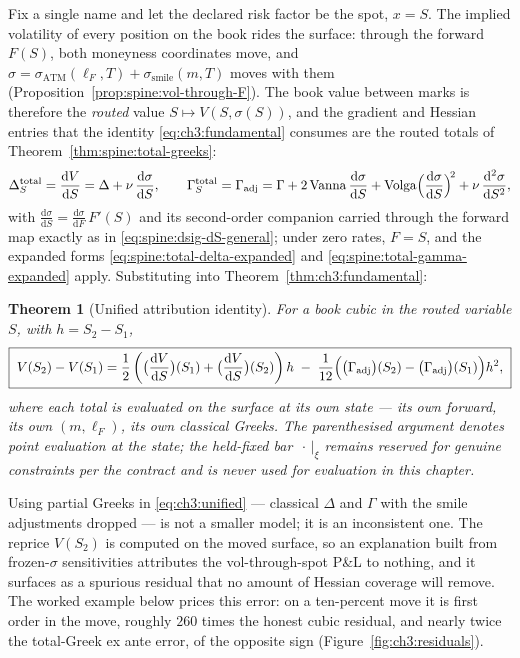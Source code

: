 \documentclass[11pt]{book}
\theoremstyle{plain}
\newtheorem{theorem}{Theorem}[chapter]
\theoremstyle{definition}
\theoremstyle{remark}
\newcommand{\mln}{m}                             %
\newcommand{\lF}{\ell_F}                         %
\newcommand{\ssm}{\sigma_{\mathrm{smile}}}       %
\newcommand{\satm}{\sigma_{\mathrm{ATM}}}        %
\newcommand{\vega}{\nu}                          %
\newcommand{\Vanna}{\mathrm{Vanna}}
\newcommand{\Volga}{\mathrm{Volga}}
\newcommand{\Gadj}{\Gamma_{\mathrm{adj}}}        %
\newcommand{\SigmaM}{\Sigma_M}                   %
\newcommand{\dd}{\mathrm{d}}                                  %
\newcommand{\pd}[2]{\frac{\partial #1}{\partial #2}}          %
\newcommand{\td}[2]{\frac{\dd #1}{\dd #2}}                    %
\newcommand{\atfixed}[2]{\left.#1\right|_{#2}}                %
\begin{document}
Fix a single name and let the declared risk factor be the spot, $x = S$. The
implied volatility of every position on the book rides the surface: through
the forward $F(S)$, both moneyness coordinates move, and
$\sigma = \satm(\lF,T) + \ssm(\mln,T)$ moves with them
(Proposition~\ref{prop:spine:vol-through-F}). The book value between marks is
therefore the \emph{routed} value $S \mapsto V(S, \sigma(S))$, and the
gradient and Hessian entries that the identity
\eqref{eq:ch3:fundamental} consumes are the routed totals of
Theorem~\ref{thm:spine:total-greeks}:
\[
  \Delta_S^{\mathrm{total}} = \td{V}{S} = \Delta + \vega\,\td{\sigma}{S},
  \qquad
  \Gamma_S^{\mathrm{total}} = \Gadj
  = \Gamma + 2\,\Vanna\,\td{\sigma}{S}
    + \Volga\Bigl(\td{\sigma}{S}\Bigr)^{\!2}
    + \vega\,\frac{\dd^2\sigma}{\dd S^2},
\]
with $\td{\sigma}{S} = \td{\sigma}{F}\,F'(S)$ and its second-order companion
carried through the forward map exactly as in
\eqref{eq:spine:dsig-dS-general}; under zero rates, $F = S$, and the expanded
forms \eqref{eq:spine:total-delta-expanded} and
\eqref{eq:spine:total-gamma-expanded} apply. Substituting into
Theorem~\ref{thm:ch3:fundamental}:

\begin{theorem}[Unified attribution identity]\label{thm:ch3:unified}
For a book cubic in the routed variable $S$, with $h = S_2 - S_1$,
\begin{equation}\label{eq:ch3:unified}
  \boxed{\;
  V(S_2) - V(S_1)
  = \frac{1}{2}\left(
      \evalat{\td{V}{S}}{S_1} + \evalat{\td{V}{S}}{S_2}
    \right) h
  \;-\; \frac{1}{12}\Bigl(\evalat{\Gadj}{S_2} - \evalat{\Gadj}{S_1}\Bigr) h^2 ,
  \;}
\end{equation}
where each total is evaluated on the surface at its own state --- its own
forward, its own $(\mln, \lF)$, its own classical Greeks. The parenthesised
argument denotes point evaluation at the state; the held-fixed bar
$\atfixed{\,\cdot\,}{\xi}$ remains reserved for genuine constraints per the
contract and is never used for evaluation in this chapter.
\end{theorem}

Using partial Greeks in \eqref{eq:ch3:unified} --- classical $\Delta$ and
$\Gamma$ with the smile adjustments dropped --- is not a smaller model; it is
an inconsistent one. The reprice $V(S_2)$ is computed on the moved surface,
so an explanation built from frozen-$\sigma$ sensitivities attributes the
vol-through-spot P\&L to nothing, and it surfaces as a spurious residual that
no amount of Hessian coverage will remove. The worked example below prices
this error: on a ten-percent move it is first order in the move, roughly
$260$ times the honest cubic residual, and nearly twice the total-Greek ex
ante error, of the opposite sign (Figure~\ref{fig:ch3:residuals}).
\end{document}
